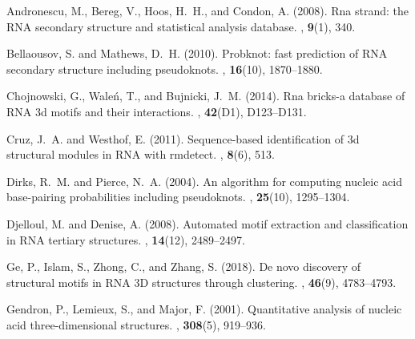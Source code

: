 \documentclass{bioinfo}
\begin{document}
\begin{thebibliography}{25}
   Andronescu, M., Bereg, V., Hoos, H.~H., and Condon, A. (2008).
   \newblock Rna strand: the {RNA} secondary structure and statistical analysis
     database.
   , {\bf 9}(1), 340.
   
   Bellaousov, S. and Mathews, D.~H. (2010).
   \newblock Probknot: fast prediction of {RNA} secondary structure including
     pseudoknots.
   , {\bf 16}(10), 1870--1880.
   
   Chojnowski, G., Wale{\'n}, T., and Bujnicki, J.~M. (2014).
   \newblock Rna bricks-a database of {RNA} 3d motifs and their interactions.
   , {\bf 42}(D1), D123--D131.
   
   Cruz, J.~A. and Westhof, E. (2011).
   \newblock Sequence-based identification of 3d structural modules in {RNA} with
     rmdetect.
   , {\bf 8}(6), 513.
   
   Dirks, R.~M. and Pierce, N.~A. (2004).
   \newblock An algorithm for computing nucleic acid base-pairing probabilities
     including pseudoknots.
   , {\bf 25}(10), 1295--1304.
   
   Djelloul, M. and Denise, A. (2008).
   \newblock Automated motif extraction and classification in {RNA} tertiary
     structures.
   , {\bf 14}(12), 2489--2497.

   Ge, P., Islam, S., Zhong, C., and Zhang, S. (2018). 
   \newblock De novo discovery of structural motifs in RNA 3D structures through clustering. 
   , {\bf 46}(9), 4783--4793.
   
   Gendron, P., Lemieux, S., and Major, F. (2001).
   \newblock Quantitative analysis of nucleic acid three-dimensional structures.
   , {\bf 308}(5), 919--936.
      

\end{thebibliography}
\end{document}
